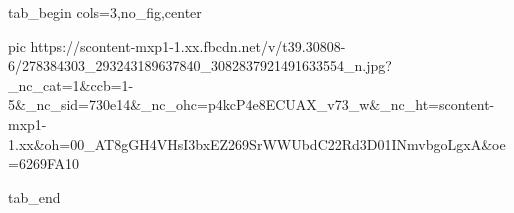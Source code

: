  
 
 
 
 


\ifcmt
  tab_begin cols=3,no_fig,center

     pic https://scontent-mxp1-1.xx.fbcdn.net/v/t39.30808-6/278384303_293243189637840_3082837921491633554_n.jpg?_nc_cat=1&ccb=1-5&_nc_sid=730e14&_nc_ohc=p4kcP4e8ECUAX_v73_w&_nc_ht=scontent-mxp1-1.xx&oh=00_AT8gGH4VHsI3bxEZ269SrWWUbdC22Rd3D01INmvbgoLgxA&oe=6269FA10

  tab_end
\fi
